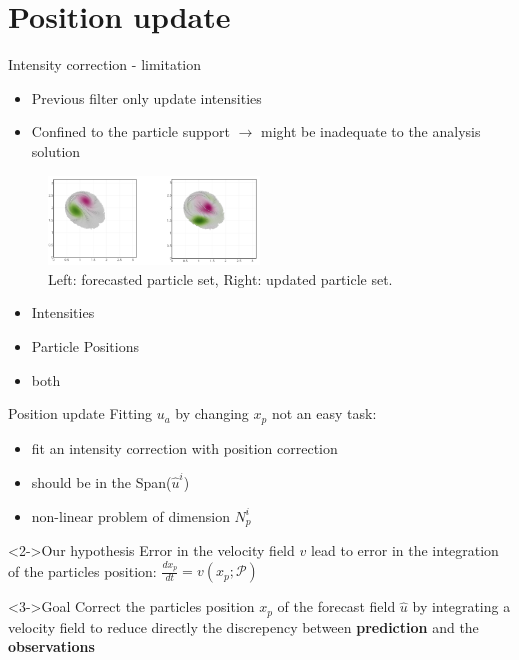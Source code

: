 \documentclass[aspectratio=169]{beamer} %
\begin{document}
\section{Position update}
\begin{frame}{Intensity correction - limitation}
    \begin{itemize}
        \item Previous filter only update intensities
        \item Confined to the particle support $\rightarrow$ might be inadequate to the analysis solution

    \end{itemize}

    \begin{figure}
        \centering
        \includegraphics[width=0.5\textwidth]{images/unalign_discretization.png}
        \caption{Left: forecasted particle set, Right: updated particle set.}
    \end{figure}

    \begin{itemize}
        \item<2->Intensities
        \item<2-> \textcolor{ceared}{Particle Positions}
        \item<2-> both
    \end{itemize}
\end{frame}

\begin{frame}{Position update}
    Fitting $u_a$ by changing $x_p$ not an easy task:
    \begin{itemize}
        \item fit an intensity correction with position correction
        \item should be in the Span($\hat u^i$)
        \item non-linear problem of dimension $N_p^i$
    \end{itemize}

    \begin{block}<2->{Our hypothesis}
        Error in the velocity field $v$ lead to error in the integration of the particles position: $\frac{d x_p}{d t} = v(x_p; \mathcal P)$
    \end{block}

    \begin{block}<3->{Goal}
        Correct the particles position $x_p$ of the forecast field $\hat u$ by integrating a velocity field to reduce directly the discrepency between \textbf{prediction} and the \textbf{observations}
    \end{block}
\end{frame}
\end{document}
